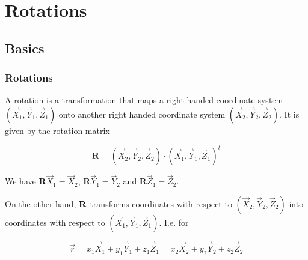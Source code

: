 \documentclass[compress]{beamer}
\begin{document}
\begin{frame}[fragile]
\end{frame}

\section{Rotations}

\subsection*{Basics}

\begin{frame}[fragile]
  \frametitle{Rotations}

  A rotation is a transformation that maps a right handed coordinate system
  $(\vec X_{1}, \vec Y_{1}, \vec Z_{1})$ onto another right handed coordinate
  system $(\vec X_{2}, \vec Y_{2}, \vec Z_{2})$. It is given by the rotation
  matrix

  \begin{equation*}
    \mathbf R = (\vec X_{2}, \vec Y_{2}, \vec Z_{2}) \cdot (\vec X_{1}, \vec Y_{1}, \vec Z_{1})^{t}
  \end{equation*}

  \medskip

  We have $\mathbf R \vec X_{1} = \vec X_{2}$, $\mathbf R \vec Y_{1} = \vec
  Y_{2}$ and $\mathbf R \vec Z_{1} = \vec Z_{2}$.

  \medskip
  \pause

  On the other hand, $\bf R$ transforms coordinates with respect to $(\vec
  X_{2}, \vec Y_{2}, \vec Z_{2})$ into coordinates with respect to $(\vec
  X_{1}, \vec Y_{1}, \vec Z_{1})$. I.e. for

  \begin{equation*}
    \vec r
    = x_{1} \vec X_{1} + y_{1} \vec Y_{1} + z_{1} \vec Z_{1}
    = x_{2} \vec X_{2} + y_{2} \vec Y_{2} + z_{2} \vec Z_{2}
  \end{equation*}


\end{frame}
\end{document}
